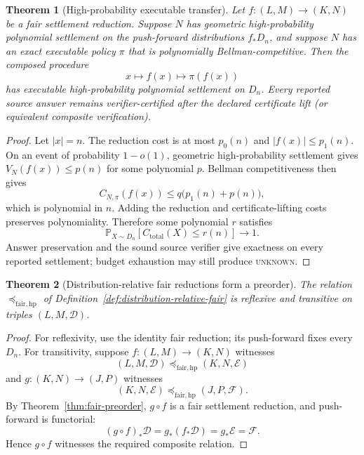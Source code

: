 \documentclass[11pt]{article}
\newtheorem{theorem}{Theorem}[section]
\theoremstyle{definition}
\newcommand{\Prob}{\mathbb{P}}
\newcommand{\UNKNOWN}{\textsc{unknown}}
\begin{document}
\begin{theorem}[High-probability executable transfer]\label{thm:hp-transfer}
Let $f:(L,M)\to(K,N)$ be a fair settlement reduction. Suppose $N$ has geometric high-probability polynomial settlement on the push-forward distributions $f_*D_n$, and suppose $N$ has an exact executable policy $\pi$ that is polynomially Bellman-competitive. Then the composed procedure
\[
x\longmapsto f(x)\longmapsto \pi(f(x))
\]
has executable high-probability polynomial settlement on $D_n$. Every reported source answer remains verifier-certified after the declared certificate lift (or equivalent composite verification).
\end{theorem}

\begin{proof}
Let $|x|=n$. The reduction cost is at most $p_0(n)$ and $|f(x)|\le p_1(n)$. On an event of probability $1-o(1)$, geometric high-probability settlement gives $V_N(f(x))\le p(n)$ for some polynomial $p$. Bellman competitiveness then gives
\[
C_{N,\pi}(f(x))\le q\bigl(p_1(n)+p(n)\bigr),
\]
which is polynomial in $n$. Adding the reduction and certificate-lifting costs preserves polynomiality. Therefore some polynomial $r$ satisfies
\[
\Prob_{X\sim D_n}[C_{\mathrm{total}}(X)\le r(n)]\longrightarrow1.
\]
Answer preservation and the sound source verifier give exactness on every reported settlement; budget exhaustion may still produce \UNKNOWN{}.
\end{proof}

\begin{theorem}[Distribution-relative fair reductions form a preorder]\label{thm:distribution-preorder}
The relation $\preceq_{\mathrm{fair,hp}}$ of Definition~\ref{def:distribution-relative-fair} is reflexive and transitive on triples $(L,M,\mathcal D)$.
\end{theorem}

\begin{proof}
For reflexivity, use the identity fair reduction; its push-forward fixes every $D_n$. For transitivity, suppose $f:(L,M)\to(K,N)$ witnesses
\[
(L,M,\mathcal D)\preceq_{\mathrm{fair,hp}}(K,N,\mathcal E)
\]
and $g:(K,N)\to(J,P)$ witnesses
\[
(K,N,\mathcal E)\preceq_{\mathrm{fair,hp}}(J,P,\mathcal F).
\]
By Theorem~\ref{thm:fair-preorder}, $g\circ f$ is a fair settlement reduction, and push-forward is functorial:
\[
(g\circ f)_*\mathcal D=g_*(f_*\mathcal D)=g_*\mathcal E=\mathcal F.
\]
Hence $g\circ f$ witnesses the required composite relation.
\end{proof}
\end{document}
